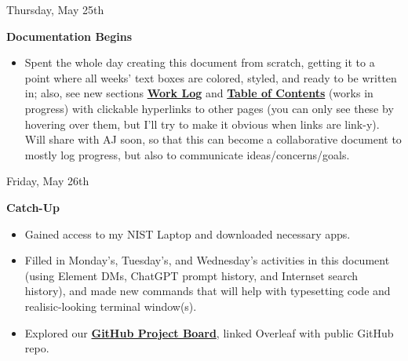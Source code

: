 \documentclass[11pt]{article}
\begin{document}
\begin{redbox}{Thursday, May 25th\vspace{-2.2em}\begin{flushright}\large\textbf{Documentation Begins} \end{flushright}}
    \begin{itemize}
        \item Spent the whole day creating this document from scratch, getting it to a point where all weeks' text boxes are colored, styled, and ready to be written in; also, see new sections \hyperlink{page.3}{\textbf{Work Log}} and \hyperlink{page.1}{\textbf{Table of Contents}} (works in progress) with clickable hyperlinks to other pages (you can only see these by hovering over them, but I'll try to make it obvious when links are link-y). Will share with AJ soon, so that this can become a collaborative document to mostly log progress, but also to communicate ideas/concerns/goals.
    \end{itemize}
\end{redbox}

\begin{center}
    \hspace{0.2cm}
    \vspace{-0.5em}
\end{center}

\begin{redbox}{Friday, May 26th\vspace{-2.2em}\begin{flushright}\large\textbf{Catch-Up} \end{flushright}}
    \begin{itemize}
        \item Gained access to my NIST Laptop and downloaded necessary apps.
        \vspace{-0.65em}
        \item Filled in Monday's, Tuesday's, and Wednesday's activities in this document (using Element DMs, ChatGPT prompt history, and Internset search history), and made new commands that will help with typesetting code and realisic-looking terminal window(s). 
        \vspace{-2em}
        \item Explored our \href{https://github.com/users/aj-stein-nist/projects/2}{\textbf{GitHub Project Board}}, linked Overleaf with public GitHub repo.
    \end{itemize}
\end{redbox}
\end{document}
